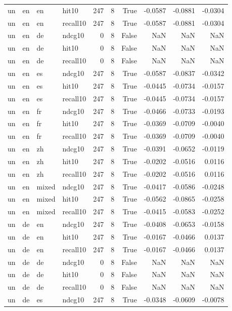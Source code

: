 \begin{tabular}{llllrrrrrr}
un & en & en & hit10 & 247 & 8 & True & -0.0587 & -0.0881 & -0.0304 \\
un & en & en & recall10 & 247 & 8 & True & -0.0587 & -0.0881 & -0.0304 \\
un & en & de & ndcg10 & 0 & 8 & False & NaN & NaN & NaN \\
un & en & de & hit10 & 0 & 8 & False & NaN & NaN & NaN \\
un & en & de & recall10 & 0 & 8 & False & NaN & NaN & NaN \\
un & en & es & ndcg10 & 247 & 8 & True & -0.0587 & -0.0837 & -0.0342 \\
un & en & es & hit10 & 247 & 8 & True & -0.0445 & -0.0734 & -0.0157 \\
un & en & es & recall10 & 247 & 8 & True & -0.0445 & -0.0734 & -0.0157 \\
un & en & fr & ndcg10 & 247 & 8 & True & -0.0466 & -0.0733 & -0.0193 \\
un & en & fr & hit10 & 247 & 8 & True & -0.0369 & -0.0709 & -0.0040 \\
un & en & fr & recall10 & 247 & 8 & True & -0.0369 & -0.0709 & -0.0040 \\
un & en & zh & ndcg10 & 247 & 8 & True & -0.0391 & -0.0652 & -0.0119 \\
un & en & zh & hit10 & 247 & 8 & True & -0.0202 & -0.0516 & 0.0116 \\
un & en & zh & recall10 & 247 & 8 & True & -0.0202 & -0.0516 & 0.0116 \\
un & en & mixed & ndcg10 & 247 & 8 & True & -0.0417 & -0.0586 & -0.0248 \\
un & en & mixed & hit10 & 247 & 8 & True & -0.0562 & -0.0865 & -0.0258 \\
un & en & mixed & recall10 & 247 & 8 & True & -0.0415 & -0.0583 & -0.0252 \\
un & de & en & ndcg10 & 247 & 8 & True & -0.0408 & -0.0653 & -0.0158 \\
un & de & en & hit10 & 247 & 8 & True & -0.0167 & -0.0466 & 0.0137 \\
un & de & en & recall10 & 247 & 8 & True & -0.0167 & -0.0466 & 0.0137 \\
un & de & de & ndcg10 & 0 & 8 & False & NaN & NaN & NaN \\
un & de & de & hit10 & 0 & 8 & False & NaN & NaN & NaN \\
un & de & de & recall10 & 0 & 8 & False & NaN & NaN & NaN \\
un & de & es & ndcg10 & 247 & 8 & True & -0.0348 & -0.0609 & -0.0078 \\

\end{tabular}
